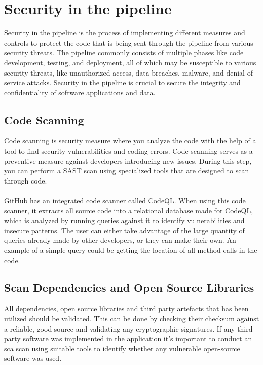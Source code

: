 \section{Security in the pipeline}
Security in the pipeline is the process of implementing different measures and controls to protect the code that is being sent through the pipeline from various security threats. The pipeline commonly consists of multiple phases like code development, testing, and deployment, all of which may be susceptible to various security threats, like unauthorized access, data breaches, malware, and denial-of-service attacks. Security in the pipeline is crucial to secure the integrity and confidentiality of software applications and data.

\subsection{Code Scanning}
Code scanning is security measure where you analyze the code with the help of a tool to find security vulnerabilities and coding errors. Code scanning serves as a preventive measure against developers introducing new issues. During this step, you can perform a SAST scan using specialized tools that are designed to scan through code. 
\\~\\
GitHub has an integrated code scanner called CodeQL. When using this code scanner, it extracts all source code into a relational database made for CodeQL, which is analyzed by running queries against it to identify vulnerabilities and insecure patterns. The user can either take advantage of the large quantity of queries already made by other developers, or they can make their own. An example of a simple query could be getting the location of all method calls in the code. 
 \cite{codeql}
\subsection{Scan Dependencies and Open Source Libraries}
All dependencies, open source libraries and third party artefacts that has been utilized should be validated. This can be done by checking their checksum against a reliable, good source and validating any cryptographic signatures. If any third party software was implemented in the application it's important to conduct an \acrshort{sca} scan using suitable tools to identify whether any vulnerable open-source software was used. \cite{bestpracticeSupplyChain}

